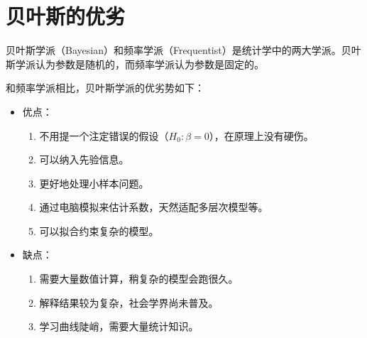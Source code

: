 \documentclass[UTF8]{ctexart}
\begin{document}
\section{贝叶斯的优劣}

贝叶斯学派（Bayesian）和频率学派（Frequentist）是统计学中的两大学派。贝叶斯学派认为参数是随机的，而频率学派认为参数是固定的。

和频率学派相比，贝叶斯学派的优劣势如下：

\begin{itemize}
	\item 优点：
	      \begin{enumerate}
		      \item 不用提一个注定错误的假设（$H_0: \beta = 0$），在原理上没有硬伤。
		      \item 可以纳入先验信息。
		      \item 更好地处理小样本问题。
		      \item 通过电脑模拟来估计系数，天然适配多层次模型等。
		      \item 可以拟合约束复杂的模型。
	      \end{enumerate}
	\item 缺点：
	      \begin{enumerate}
		      \item 需要大量数值计算，稍复杂的模型会跑很久。
		      \item 解释结果较为复杂，社会学界尚未普及。
		      \item 学习曲线陡峭，需要大量统计知识。
	      \end{enumerate}
\end{itemize}
\end{document}

